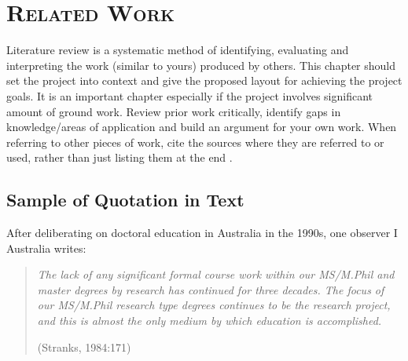 \chapter{\textsc{Related Work}}

Literature review is a systematic method of identifying, evaluating and interpreting the
work (similar to yours) produced by others. This chapter should set the project into context
and give the proposed layout for achieving the project goals. It is an important chapter
especially if the project involves significant amount of ground work. Review prior work
critically, identify gaps in knowledge/areas of application and build an argument for your
own work. When referring to other pieces of work, cite the sources where they are referred
to or used, rather than just listing them at the end \cite{symeonidis2014transitive}.

\section{Sample of Quotation in Text}
After deliberating on doctoral education in Australia in the 1990s, one
observer I Australia writes:

\blockquote{\textit{The lack of any significant formal course work within our MS/M.Phil and
master degrees by research has continued for three decades. The focus
of our MS/M.Phil research type degrees continues to be the research
project, and this is almost the only medium by which education is
accomplished.
}
\begin{flushright}
(Stranks, 1984:171)
\end{flushright}
}

